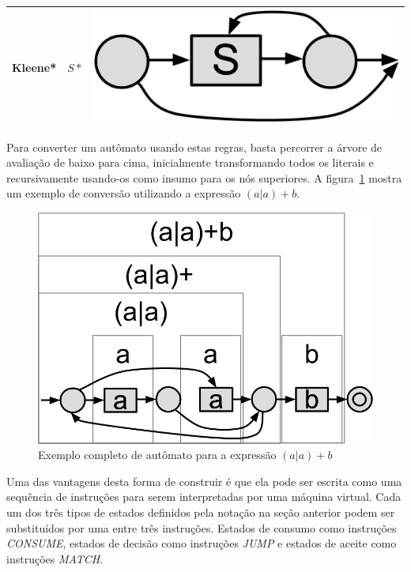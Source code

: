 \documentclass[a4paper,12pt,oneside,onecolumn]{uerj}
\begin{document}
\begin{center}
\begin{tabular}{ c | c | c }
		\hline
		Kleene* & $S*$ & \includegraphics[scale=0.25]{figures/thompson_kleene.png} \\ 
		\hline
	\end{tabular}
\end{center}

Para converter um autômato usando estas regras, basta percorrer a árvore de avaliação de baixo para cima, inicialmente transformando todos os literais e recursivamente usando-os como insumo para os nós superiores. A figura~\ref{fig:exemplo_automato_completo} mostra um exemplo de conversão utilizando a expressão $(a|a)+b$.

\begin{figure}[ht]
  \centering
  \includegraphics[scale=0.33]{figures/exemplo_automato_completo.png}
  \caption{Exemplo completo de autômato para a expressão $(a|a)+b$}
  \label{fig:exemplo_automato_completo}
\end{figure}

Uma das vantagens desta forma de construir é que ela pode ser escrita como uma sequência de instruções para serem interpretadas por uma máquina virtual. Cada um dos três tipos de estados definidos pela notação na seção anterior podem ser substituídos por uma entre três instruções. Estados de consumo como instruções \emph{CONSUME}, estados de decisão como instruções \emph{JUMP} e estados de aceite como instruções \emph{MATCH}.
\end{document}
